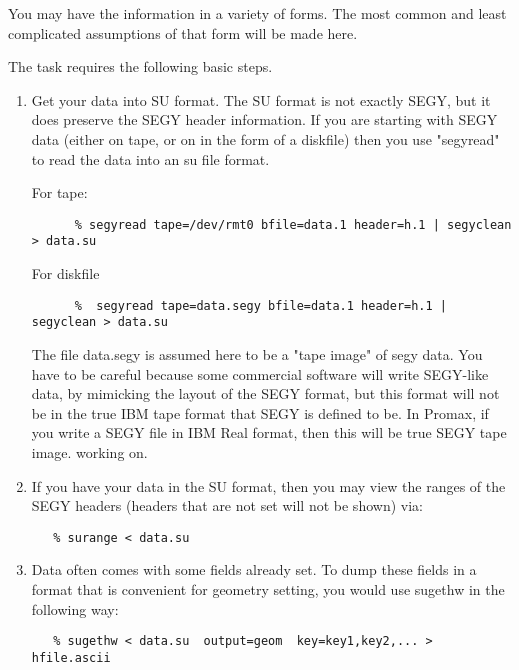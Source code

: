 {{{{{{{\begin{rmans}
\vspace{1ex}
\noindent You may have the information in a variety of forms.
The most common and least complicated assumptions of that form 
will be made here.

\vspace{1ex}
\noindent The task requires the following basic steps.

\vspace{1ex}
\begin{enumerate}
\item Get your data into SU format. The SU format is not exactly SEGY,
   but it does preserve the SEGY header information. If you are
   starting with SEGY data (either on tape, or on in the form of
   a diskfile) then you use "segyread" to read the data into an
   su file format.

   For tape:

{\small \begin{verbatim}
      % segyread tape=/dev/rmt0 bfile=data.1 header=h.1 | segyclean > data.su
\end{verbatim}}\noindent

   For diskfile

{\small \begin{verbatim}
      %  segyread tape=data.segy bfile=data.1 header=h.1 | segyclean > data.su
\end{verbatim}} \noindent
   The file   data.segy is assumed here to be a "tape image" of segy data.
   You have to be careful because some commercial software will write
   SEGY-like data, by mimicking the layout of the SEGY format, but 
   this format will not be in the true IBM tape format that SEGY is defined
   to be.  In Promax, if you write a SEGY file in IBM Real format, then this
   will be true SEGY tape image.
   working on.

\item If you have your data in the SU format, then you may view the
   ranges of the SEGY headers (headers that are not set will not
   be shown) via:
{\small \begin{verbatim}
   % surange < data.su
\end{verbatim}}

\item Data often comes with some fields already set. To dump these
   fields in a format that is convenient for geometry setting,
   you would use    sugethw  in the following way:

{\small \begin{verbatim}
   % sugethw < data.su  output=geom  key=key1,key2,... > hfile.ascii
\end{verbatim}}


\end{enumerate}
\end{rmans}}}}}}}}
